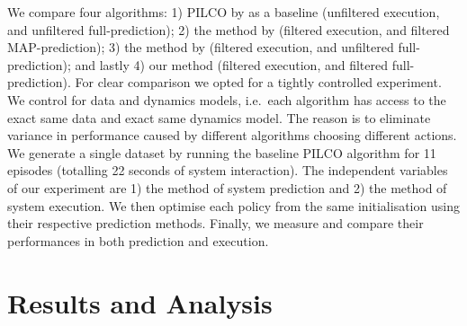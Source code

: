 \documentclass{article}
\begin{document}
We compare four algorithms:
1) PILCO by \citet{pilco} as a baseline (unfiltered execution, and unfiltered full-prediction);
2) the method by \citet{dallaire2009} (filtered execution, and filtered MAP-prediction);
3) the method by \citet{deisenroth2013} (filtered execution, and unfiltered full-prediction);
and lastly
4) our method (filtered execution, and filtered full-prediction).
For clear comparison
we opted for a tightly controlled experiment.
We control for data and dynamics models,
i.e.\ each algorithm has access to the exact same data and exact same dynamics model.
The reason is to
eliminate variance in performance caused by different algorithms choosing different actions.
We generate a single dataset by running the baseline PILCO algorithm
for 11 episodes (totalling 22 seconds of system interaction). %
The independent variables of our experiment are
1) the method of system prediction and
2) the method of system execution.
We then optimise each policy from the same initialisation
using their respective prediction methods.
Finally, we measure and compare their performances
in both prediction and execution.

\section{Results and Analysis}\label{sec:result-and-analysis}
\end{document}
